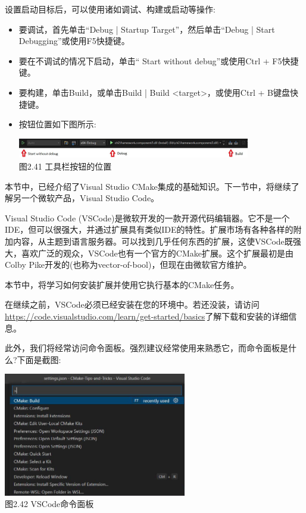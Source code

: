 设置启动目标后，可以使用诸如调试、构建或启动等操作:

\begin{itemize}
\item 
要调试，首先单击“Debug | Startup Target”，然后单击“Debug | Start Debugging”或使用F5快捷键。

\item 
要在不调试的情况下启动，单击“ Start without debug”或使用Ctrl + F5快捷键。

\item 
要构建，单击Build，或单击Build | Build <target>，或使用Ctrl + B键盘快捷键。

\item
按钮位置如下图所示:

\begin{center}
\includegraphics[width=0.8\textwidth]{content/1/chapter2/images/41.jpg}\\
图2.41 工具栏按钮的位置
\end{center}
\end{itemize}

本节中，已经介绍了Visual Studio CMake集成的基础知识。下一节中，将继续了解另一个微软产品，Visual Studio Code。


Visual Studio Code (VSCode)是微软开发的一款开源代码编辑器。它不是一个IDE，但可以很强大，并通过扩展具有类似IDE的特性。扩展市场有各种各样的附加内容，从主题到语言服务器。可以找到几乎任何东西的扩展，这使VSCode既强大，喜欢广泛的观众，VSCode也有一个官方的CMake扩展。这个扩展最初是由Colby Pike开发的(也称为vector-of-bool)，但现在由微软官方维护。

本节中，将学习如何安装扩展并使用它执行基本的CMake任务。

在继续之前，VSCode必须已经安装在您的环境中。若还没装，请访问\url{https://code.visualstudio.com/learn/get-started/basics}了解下载和安装的详细信息。

此外，我们将经常访问命令面板。强烈建议经常使用来熟悉它，而命令面板是什么?下面是截图:

\begin{center}
\includegraphics[width=0.6\textwidth]{content/1/chapter2/images/42.jpg}\\
图2.42 VSCode命令面板
\end{center}

